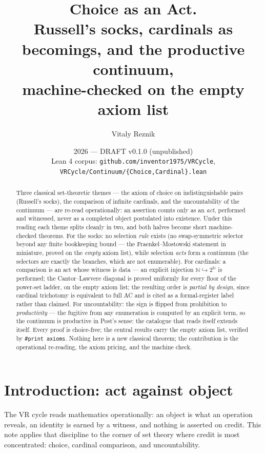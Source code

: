 \documentclass[11pt]{article}
\title{\textbf{Choice as an Act.}\\[2pt]
\large Russell's socks, cardinals as becomings, and the productive
continuum,\\ machine-checked on the empty axiom list}
\author{Vitaly Reznik}
\date{2026 --- DRAFT v0.1.0 (unpublished)\\[2pt]
\small Lean 4 corpus: \texttt{github.com/inventor1975/VRCycle},
\texttt{VRCycle/Continuum/\{Choice,Cardinal\}.lean}}
\theoremstyle{remark}
\newcommand{\N}{\mathbb{N}}
\begin{document}
\maketitle

\begin{abstract}
Three classical set-theoretic themes --- the axiom of choice on
indistinguishable pairs (Russell's socks), the comparison of infinite
cardinals, and the uncountability of the continuum --- are re-read
operationally: an assertion counts only as an \emph{act}, performed and
witnessed, never as a completed object postulated into existence.  Under
this reading each theme splits cleanly in two, and both halves become
short machine-checked theorems.  For the socks: no selection \emph{rule}
exists (no swap-symmetric selector beyond any finite bookkeeping bound
--- the Fraenkel--Mostowski statement in miniature, proved on the
\emph{empty} axiom list), while selection \emph{acts} form a continuum
(the selectors are exactly the branches, which are not enumerable).  For
cardinals: a comparison is an act whose witness is data --- an explicit
injection $\N \hookrightarrow 2^{\N}$ is performed; the Cantor--Lawvere
diagonal is proved uniformly for every floor of the power-set ladder, on
the empty axiom list; the resulting order is \emph{partial by design},
since cardinal trichotomy is equivalent to full AC and is cited as a
formal-register label rather than claimed.  For uncountability: the sign
is flipped from prohibition to \emph{productivity} --- the fugitive from
any enumeration is computed by an explicit term, so the continuum is
productive in Post's sense: the catalogue that reads itself extends
itself.  Every proof is choice-free; the central results carry the empty
axiom list, verified by \texttt{\#print axioms}.  Nothing here is a new
classical theorem; the contribution is the operational re-reading, the
axiom pricing, and the machine check.
\end{abstract}

\section{Introduction: act against object}

The VR cycle reads mathematics operationally: an object is what an
operation reveals, an identity is earned by a witness, and nothing is
asserted on credit.  This note applies that discipline to the corner of
set theory where credit is most concentrated: choice, cardinal
comparison, and uncountability.
\end{document}

